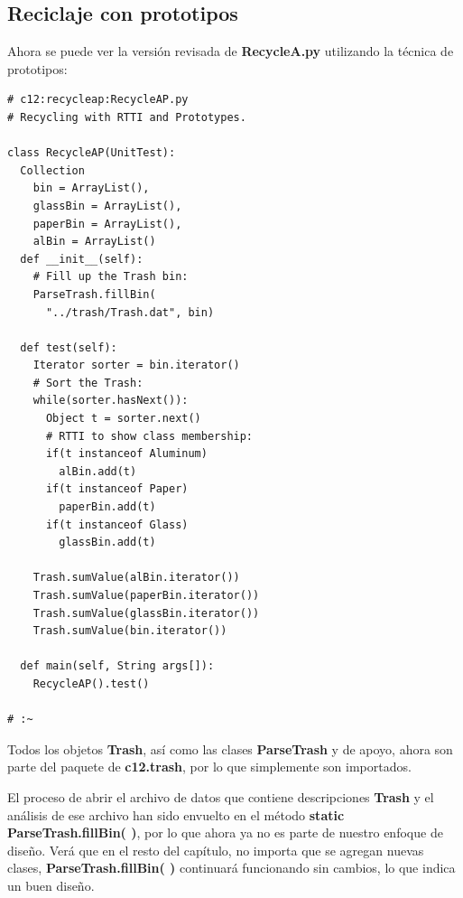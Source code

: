 \documentclass{article}
\begin{document}
\subsection{Reciclaje con prototipos}

Ahora se puede ver la versión revisada de \textbf{RecycleA.py} utilizando la técnica de prototipos:     \newline

\begin{lstlisting} 
# c12:recycleap:RecycleAP.py  
# Recycling with RTTI and Prototypes. 

class RecycleAP(UnitTest): 
  Collection 
    bin = ArrayList(),  
    glassBin = ArrayList(), 
    paperBin = ArrayList(), 
    alBin = ArrayList() 
  def __init__(self): 
    # Fill up the Trash bin: 
    ParseTrash.fillBin( 
      "../trash/Trash.dat", bin) 
      
  def test(self): 
    Iterator sorter = bin.iterator() 
    # Sort the Trash: 
    while(sorter.hasNext()): 
      Object t = sorter.next() 
      # RTTI to show class membership: 
      if(t instanceof Aluminum) 
        alBin.add(t) 
      if(t instanceof Paper) 
        paperBin.add(t) 
      if(t instanceof Glass) 
        glassBin.add(t) 
        
    Trash.sumValue(alBin.iterator()) 
    Trash.sumValue(paperBin.iterator()) 
    Trash.sumValue(glassBin.iterator()) 
    Trash.sumValue(bin.iterator()) 
    
  def main(self, String args[]): 
    RecycleAP().test() 
    
# :~     
\end{lstlisting}

Todos los objetos \textbf{Trash}, así como las clases \textbf{ParseTrash} y de apoyo, ahora son parte del paquete de \textbf{c12.trash}, por lo que simplemente son importados.     \newline

El proceso de abrir el archivo de datos que contiene descripciones \textbf{Trash} y el análisis de ese archivo han sido envuelto en el método \textbf{static} \textbf{ParseTrash.fillBin( )}, por lo que ahora ya no es parte de nuestro enfoque de diseño. Verá que en el resto del capítulo, no importa que se agregan nuevas clases, \textbf{ParseTrash.fillBin( )} continuará funcionando sin cambios, lo que indica un buen diseño.   \newline
\end{document}
